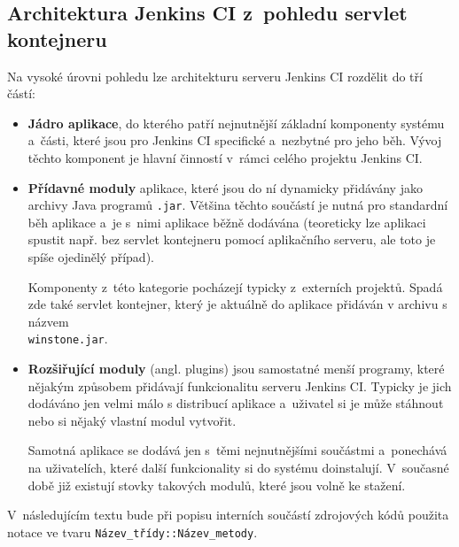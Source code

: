         \subsection{Architektura Jenkins CI z~pohledu servlet kontejneru} 
            Na vysoké úrovni pohledu lze architekturu serveru Jenkins CI rozdělit do tří částí:
            
            \begin{itemize}
                \item{\textbf{Jádro aplikace}, do kterého patří nejnutnější základní komponenty systému
                    a~části, které jsou pro Jenkins CI specifické a~nezbytné pro jeho běh. 
                    Vývoj těchto komponent je hlavní činností v~rámci celého projektu Jenkins CI.}

                \item{\textbf{Přídavné moduly} aplikace, které jsou do ní dynamicky přidávány jako archivy Java programů
                    \texttt{.jar}. Většina těchto součástí je nutná pro standardní běh aplikace a~je s~nimi aplikace
                    běžně dodávána (teoreticky lze
                    aplikaci spustit např. bez servlet kontejneru pomocí aplikačního serveru, ale toto je spíše ojedinělý případ). 
                    
                    Komponenty z~této kategorie pocházejí typicky z~externích projektů.
                    Spadá zde také servlet kontejner, který je aktuálně do aplikace
                    přidáván v archivu s názvem \\\texttt{winstone.jar}.}

                \item{\textbf{Rozšiřující moduly} (angl. plugins) jsou samostatné menší programy, které nějakým
                    způsobem přidávají funkcionalitu serveru Jenkins CI. Typicky je jich dodáváno jen velmi málo s 
                    distribucí aplikace 
                    a~uživatel si je může stáhnout nebo si nějaký vlastní modul vytvořit.
                    
                    Samotná aplikace se dodává jen s~těmi nejnutnějšími součástmi a~ponechává na uživatelích, které
                    další funkcionality si do systému doinstalují. V~současné době již existují stovky takových
                    modulů, které jsou volně ke stažení. }
            \end{itemize}
            

            V~následujícím textu bude při popisu interních součástí zdrojových kódů použita notace
            ve tvaru \texttt{Název\_třídy::Název\_metody}.

